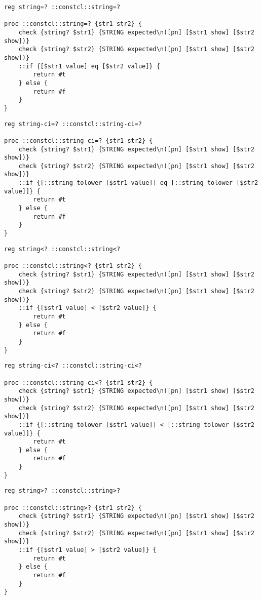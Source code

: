 \documentclass{report}
\begin{document}
\noindent\makebox[\linewidth]{\rule{\linewidth}{0.4pt}}
\begin{lstlisting}
reg string=? ::constcl::string=?
 
proc ::constcl::string=? {str1 str2} {
    check {string? $str1} {STRING expected\n([pn] [$str1 show] [$str2 show])}
    check {string? $str2} {STRING expected\n([pn] [$str1 show] [$str2 show])}
    ::if {[$str1 value] eq [$str2 value]} {
        return #t
    } else {
        return #f
    }
}
\end{lstlisting}
\noindent\makebox[\linewidth]{\rule{\linewidth}{0.4pt}}
\noindent\makebox[\linewidth]{\rule{\linewidth}{0.4pt}}
\begin{lstlisting}
reg string-ci=? ::constcl::string-ci=?
 
proc ::constcl::string-ci=? {str1 str2} {
    check {string? $str1} {STRING expected\n([pn] [$str1 show] [$str2 show])}
    check {string? $str2} {STRING expected\n([pn] [$str1 show] [$str2 show])}
    ::if {[::string tolower [$str1 value]] eq [::string tolower [$str2 value]]} {
        return #t
    } else {
        return #f
    }
}
\end{lstlisting}
\noindent\makebox[\linewidth]{\rule{\linewidth}{0.4pt}}
\noindent\makebox[\linewidth]{\rule{\linewidth}{0.4pt}}
\begin{lstlisting}
reg string<? ::constcl::string<?
 
proc ::constcl::string<? {str1 str2} {
    check {string? $str1} {STRING expected\n([pn] [$str1 show] [$str2 show])}
    check {string? $str2} {STRING expected\n([pn] [$str1 show] [$str2 show])}
    ::if {[$str1 value] < [$str2 value]} {
        return #t
    } else {
        return #f
    }
}
\end{lstlisting}
\noindent\makebox[\linewidth]{\rule{\linewidth}{0.4pt}}
\noindent\makebox[\linewidth]{\rule{\linewidth}{0.4pt}}
\begin{lstlisting}
reg string-ci<? ::constcl::string-ci<?
 
proc ::constcl::string-ci<? {str1 str2} {
    check {string? $str1} {STRING expected\n([pn] [$str1 show] [$str2 show])}
    check {string? $str2} {STRING expected\n([pn] [$str1 show] [$str2 show])}
    ::if {[::string tolower [$str1 value]] < [::string tolower [$str2 value]]} {
        return #t
    } else {
        return #f
    }
}
\end{lstlisting}
\noindent\makebox[\linewidth]{\rule{\linewidth}{0.4pt}}
\noindent\makebox[\linewidth]{\rule{\linewidth}{0.4pt}}
\begin{lstlisting}
reg string>? ::constcl::string>?
 
proc ::constcl::string>? {str1 str2} {
    check {string? $str1} {STRING expected\n([pn] [$str1 show] [$str2 show])}
    check {string? $str2} {STRING expected\n([pn] [$str1 show] [$str2 show])}
    ::if {[$str1 value] > [$str2 value]} {
        return #t
    } else {
        return #f
    }
}
\end{lstlisting}
\end{document}
